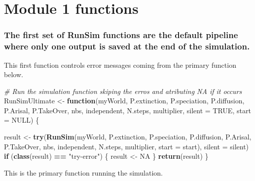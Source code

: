 \documentclass[]{book}
\newenvironment{Shaded}{\begin{snugshade}}{\end{snugshade}}
\newcommand{\KeywordTok}[1]{\textcolor[rgb]{0.13,0.29,0.53}{\textbf{{#1}}}}
\newcommand{\DataTypeTok}[1]{\textcolor[rgb]{0.13,0.29,0.53}{{#1}}}
\newcommand{\StringTok}[1]{\textcolor[rgb]{0.31,0.60,0.02}{{#1}}}
\newcommand{\CommentTok}[1]{\textcolor[rgb]{0.56,0.35,0.01}{\textit{{#1}}}}
\newcommand{\OtherTok}[1]{\textcolor[rgb]{0.56,0.35,0.01}{{#1}}}
\newcommand{\ControlFlowTok}[1]{\textcolor[rgb]{0.13,0.29,0.53}{\textbf{{#1}}}}
\newcommand{\OperatorTok}[1]{\textcolor[rgb]{0.81,0.36,0.00}{\textbf{{#1}}}}
\newcommand{\NormalTok}[1]{{#1}}
\theoremstyle{definition}
\theoremstyle{definition}
\theoremstyle{definition}
\theoremstyle{remark}
\begin{document}
\section{Module 1 functions}\label{module-1-functions}

\subsubsection{The first set of RunSim functions are the default
pipeline where only one output is saved at the end of the
simulation.}\label{the-first-set-of-runsim-functions-are-the-default-pipeline-where-only-one-output-is-saved-at-the-end-of-the-simulation.}

This first function controls error messages coming from the primary
function below.

\begin{Shaded}
\begin{Highlighting}[]
\CommentTok{# Run the simulation function skiping the erros and atributing NA if it occurs}
\NormalTok{RunSimUltimate <-}\StringTok{ }\ControlFlowTok{function}\NormalTok{(myWorld, P.extinction, P.speciation,}
\NormalTok{                           P.diffusion, P.Arisal, P.TakeOver, nbs, independent,}
\NormalTok{                           N.steps, multiplier,}
                           \DataTypeTok{silent =} \OtherTok{TRUE}\NormalTok{, }\DataTypeTok{start =} \OtherTok{NULL}\NormalTok{) \{}

\NormalTok{  result <-}\StringTok{ }\KeywordTok{try}\NormalTok{(}\KeywordTok{RunSim}\NormalTok{(myWorld, P.extinction, P.speciation,}
\NormalTok{                       P.diffusion, P.Arisal, P.TakeOver, nbs,}
\NormalTok{                       independent, N.steps,}
\NormalTok{                       multiplier, }\DataTypeTok{start =}\NormalTok{ start), }\DataTypeTok{silent =}\NormalTok{ silent)}
  \ControlFlowTok{if}\NormalTok{ (}\KeywordTok{class}\NormalTok{(result) }\OperatorTok{==}\StringTok{ "try-error"}\NormalTok{) \{}
\NormalTok{    result <-}\StringTok{ }\OtherTok{NA}
\NormalTok{  \}}
  \KeywordTok{return}\NormalTok{(result)}
\NormalTok{\}}
\end{Highlighting}
\end{Shaded}

This is the primary function running the simulation.
\end{document}

